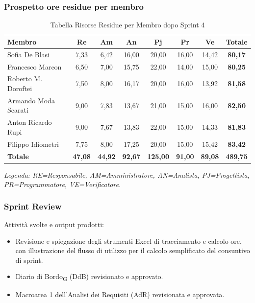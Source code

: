 \subsubsection{Prospetto ore residue per membro}
\begin{table}[H]
    \centering
    \renewcommand{\arraystretch}{1.3}
    \begin{tabularx}{\textwidth}{|X|c|c|c|c|c|c|c|}
        \hline
        \textbf{Membro} & \textbf{Re} & \textbf{Am} & \textbf{An} &
        \textbf{Pj} & \textbf{Pr} & \textbf{Ve} & \textbf{Totale} \\
        \hline
        Sofia De Blasi           &  7,33 &  6,42 & 16,00 & 20,00 & 16,00 & 14,42 & \textbf{80,17} \\
        Francesco Marcon         &  6,50 &  7,00 & 15,75 & 22,00 & 14,00 & 15,00 & \textbf{80,25} \\
        Roberto M. Doroftei      &  7,50 &  8,00 & 16,17 & 20,00 & 16,00 & 13,92 & \textbf{81,58} \\
        Armando Moda Scarati     &  9,00 &  7,83 & 13,67 & 21,00 & 15,00 & 16,00 & \textbf{82,50} \\
        Anton Ricardo Rupi       &  9,00 &  7,67 & 13,83 & 22,00 & 15,00 & 14,33 & \textbf{81,83} \\
        Filippo Idiometri        &  7,75 &  8,00 & 17,25 & 20,00 & 15,00 & 15,42 & \textbf{83,42} \\
        \hline
        \textbf{Totale} & \textbf{47,08} & \textbf{44,92} & \textbf{92,67} &
        \textbf{125,00} & \textbf{91,00} & \textbf{89,08} & \textbf{489,75} \\
        \hline
    \end{tabularx}
    \begin{minipage}{\textwidth}
        \smallskip
        \footnotesize\textit{Legenda: RE=Responsabile, AM=Amministratore,
        AN=Analista, PJ=Progettista, PR=Programmatore, VE=Verificatore.}
    \end{minipage}
    \caption{Tabella Risorse Residue per Membro dopo Sprint 4}
\end{table}

\subsubsection{Sprint Review}
Attività svolte e output prodotti:
\begin{itemize}
    \item Revisione e spiegazione degli strumenti Excel di tracciamento e calcolo
          ore, con illustrazione del flusso di utilizzo per il calcolo semplificato
          del consuntivo di sprint.
    \item Diario di Bordo\textsubscript{G} (DdB) revisionato e approvato.
    \item Macroarea 1 dell'Analisi dei Requisiti (AdR) revisionata e approvata.
\end{itemize}

